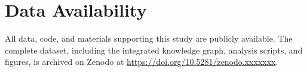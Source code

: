 \section*{Data Availability}

All data, code, and materials supporting this study are publicly available.
The complete dataset, including the integrated knowledge graph, analysis scripts,
and figures, is archived on Zenodo at \url{https://doi.org/10.5281/zenodo.xxxxxxx}.